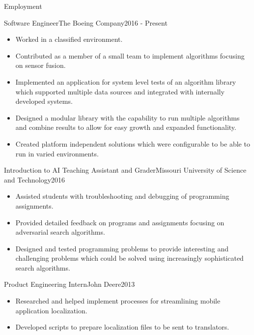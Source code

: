 \documentclass[]{mcdowellcv}
\begin{document}
\makeheader

\begin{cvsection}{Employment}

\begin{boeing}
    \begin{cvsubsection}{Software Engineer}{The Boeing Company}{2016 - Present}         
        \begin{itemize}
            \item Worked in a classified environment.
            \item Contributed as a member of a small team to implement algorithms focusing on sensor fusion.
            \item Implemented an application for system level tests of an algorithm library which supported multiple data sources and integrated with internally developed systems. 
            \item Designed a modular library with the capability to run multiple algorithms and combine results to allow for easy growth and expanded functionality.
            \item Created platform independent solutions which were configurable to be able to run in varied environments.
        \end{itemize}
    \end{cvsubsection}
\end{boeing}
    
\begin{aigrader}
    \begin{cvsubsection}[2]{Introduction to AI Teaching Assistant and Grader}{Missouri University of Science and Technology}{2016}   
        \begin{itemize}
            \item Assisted students with troubleshooting and debugging of programming assignments.
            \item Provided detailed feedback on programs and assignments focusing on adversarial search algorithms.
            \item Designed and tested programming problems to provide interesting and challenging problems which could be solved using increasingly sophisticated search algorithms.
        \end{itemize}
    \end{cvsubsection}
\end{aigrader}

\begin{johndeere}
    \begin{cvsubsection}{Product Engineering Intern}{John Deere}{2013}
        \begin{itemize}
            \item Researched and helped implement processes for streamlining mobile application localization.
            \item Developed scripts to prepare localization files to be sent to translators.
        \end{itemize}
    \end{cvsubsection}
\end{johndeere}
    

\end{cvsection}
\end{document}
